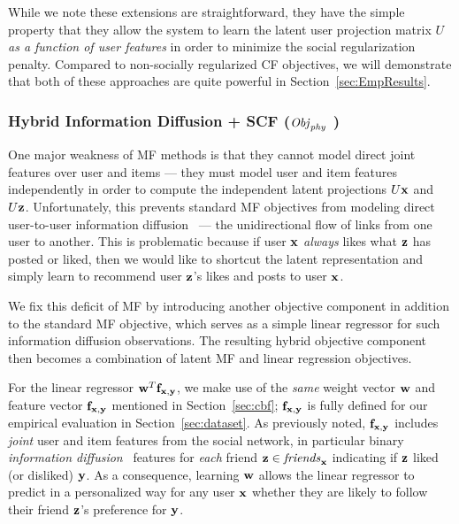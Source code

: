 While we note these extensions are straightforward, they have
the simple property that they allow the system to learn the latent
user projection matrix $U$ \emph{as a function of user features}
in order to minimize the social regularization penalty.
Compared to non-socially regularized CF objectives, we will
demonstrate that both of these approaches are quite powerful in 
Section~\ref{sec:EmpResults}.


\subsubsection{Hybrid Information Diffusion + SCF ($\mathit{Obj}_{\mathit{phy}}$ )}

\label{sec:hybrid_scf}

One major weakness of MF methods is that they cannot model direct
joint features over user and items --- they must model user and item
features independently in order to compute the independent latent
projections $U\mathbf{x}$ and $U\mathbf{z}$.  Unfortunately, this prevents standard MF
objectives from modeling direct user-to-user information
diffusion~\cite{inf_diffusion} --- the 
unidirectional flow of links from one user to another.
This is problematic because if user $\mathbf{x}$ \emph{always} likes what $\mathbf{z}$
has posted or liked, then we would like to shortcut the latent
representation and simply learn to recommend user $\mathbf{z}$'s likes and posts 
to user $\mathbf{x}$.

We fix this deficit of MF by introducing another objective component
in addition to the standard MF objective, which serves as
a simple linear regressor for such information diffusion
observations.  The resulting hybrid objective component then becomes a
combination of latent MF and linear regression objectives.

For the linear regressor $\mathbf{w}^T \mathbf{f}_{\mathbf{x},\mathbf{y}}$, we make use of the
\emph{same} weight vector $\mathbf{w}$ and feature vector $\mathbf{f}_{\mathbf{x},\mathbf{y}}$
mentioned in Section~\ref{sec:cbf}; $\mathbf{f}_{\mathbf{x},\mathbf{y}}$ is fully defined for
our empirical evaluation in Section~\ref{sec:dataset}.  As previously
noted, $\mathbf{f}_{\mathbf{x},\mathbf{y}}$ includes
\emph{joint} user and item features from the social network, in
particular binary
\emph{information diffusion}~\cite{inf_diffusion} features
for \emph{each} friend $\mathbf{z} \in \mathit{friends}_{\mathbf{x}}$ indicating if $\mathbf{z}$
liked (or disliked) $\mathbf{y}$.  As a consequence, learning $\mathbf{w}$ allows the
linear regressor to predict in a personalized way for any user $\mathbf{x}$
whether they are likely to follow their friend $\mathbf{z}$'s preference for $\mathbf{y}$.

